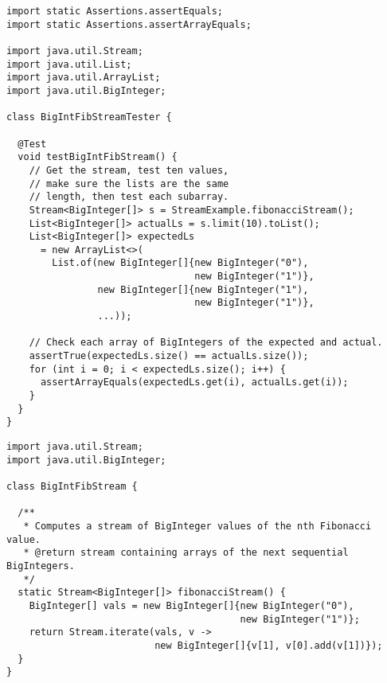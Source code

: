 \begin{lstlisting}[language=MyJava]
import static Assertions.assertEquals;
import static Assertions.assertArrayEquals;

import java.util.Stream;
import java.util.List;
import java.util.ArrayList;
import java.util.BigInteger;

class BigIntFibStreamTester {

  @Test
  void testBigIntFibStream() {
    // Get the stream, test ten values, 
    // make sure the lists are the same
    // length, then test each subarray.
    Stream<BigInteger[]> s = StreamExample.fibonacciStream();
    List<BigInteger[]> actualLs = s.limit(10).toList();
    List<BigInteger[]> expectedLs 
      = new ArrayList<>(
        List.of(new BigInteger[]{new BigInteger("0"), 
                                 new BigInteger("1")},
                new BigInteger[]{new BigInteger("1"), 
                                 new BigInteger("1")},
                ...));

    // Check each array of BigIntegers of the expected and actual.
    assertTrue(expectedLs.size() == actualLs.size());
    for (int i = 0; i < expectedLs.size(); i++) {
      assertArrayEquals(expectedLs.get(i), actualLs.get(i));
    }
  }
}
\end{lstlisting}

\begin{lstlisting}[language=MyJava]
import java.util.Stream;
import java.util.BigInteger;

class BigIntFibStream {

  /**
   * Computes a stream of BigInteger values of the nth Fibonacci value.
   * @return stream containing arrays of the next sequential BigIntegers.
   */
  static Stream<BigInteger[]> fibonacciStream() {
    BigInteger[] vals = new BigInteger[]{new BigInteger("0"),
                                         new BigInteger("1")};
    return Stream.iterate(vals, v -> 
                          new BigInteger[]{v[1], v[0].add(v[1])});
  }
}
\end{lstlisting}


